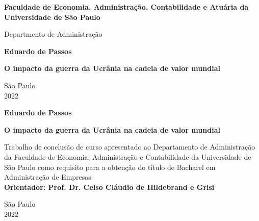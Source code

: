 \documentclass[12pt]{article}
\begin{document}
\begin{titlepage}
    \begin{center}
        \Large
        \textbf{Faculdade de Economia, Administração, Contabilidade e Atuária da Universidade de São Paulo}
        
        \large
        \vspace{0.4cm}
        Departmento de Administração
             
        \vspace{4cm}
        \textbf{Eduardo de Passos}

        \vspace{4cm}
        \textbf{O impacto da guerra da Ucrânia na cadeia de valor mundial}

        \vspace{8cm}
        São Paulo\\
        2022\\
             
    \end{center}
\end{titlepage}
\begin{titlepage}
    \begin{center}
        \vspace{4cm}
        \large\textbf{Eduardo de Passos}
             
        
        \vspace{4cm}
        \large\textbf{O impacto da guerra da Ucrânia na cadeia de valor mundial}
    \end{center}

        \vspace{4cm}
        \hspace{7cm}
        \begin{minipage}{22em}
            Trabalho de conclusão de curso
            apresentado ao Departamento de
            Administração da Faculdade de Economia,
            Administração e Contabilidade da
            Universidade de São Paulo como requisito  para a
            obtenção do título de Bacharel 
            em Administração de Empresas\\
            \textbf{Orientador: Prof. Dr. Celso Cláudio de Hildebrand e Grisi}
        \end{minipage}
              
        \hspace{7cm}
    
    \vspace{8cm}
    \begin{center}
        São Paulo\\
        2022\\
    \end{center}
\end{titlepage}
\end{document}
